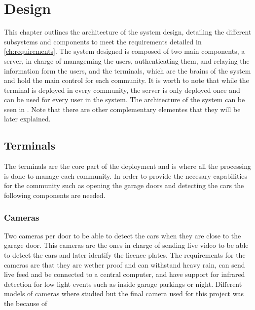 \chapter{Design}\label{ch:design}

This chapter outlines the architecture of the system design, detailing the different subsystems and components to meet the requirements detailed in \cref{ch:requirements}. The system designed is composed of two main components, a server, in charge of manageming the users, authenticating them, and relaying the information form the users, and the terminals, which are the brains of the system and hold the main control for each community. It is worth to note that while the terminal is deployed in every community, the server is only deployed once and can be used for every user in the system. The architecture of the system can be seen in . Note that there are other complementary elementes that they will be later explained.


\section{Terminals}

The terminals are the core part of the deployment and is where all the processing is done to manage each community. In order to provide the necesary capabilities for the community such as opening the garage doors and detecting the cars the following components are needed.

\subsection{Cameras}

Two cameras per door to be able to detect the cars when they are close to the garage door. This cameras are the ones in charge of sending live video to be able to detect the cars and later identify the licence plates. The requirements for the cameras are that they are wether proof and can withstand heavy rain, can send live feed and be connected to a central computer, and have support for infrared detection for low light events such as inside garage parkings or night. Different models of cameras where studied but the final camera used for this project was the  because of 


